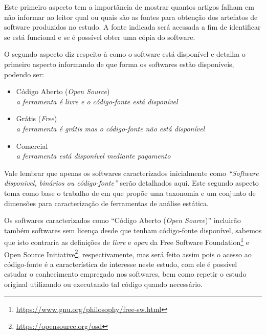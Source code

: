 Este primeiro aspecto tem a importância de mostrar quantos artigos falham em
não informar ao leitor qual ou quais são as fontes para obtenção dos artefatos
de software produzidos no estudo. A fonte indicada será acessada a fim de
identificar se está funcional e se é possível obter uma cópia do software.

%

O segundo aspecto diz respeito à como o software está disponível e detalha o
primeiro aspecto informando de que forma os softwares estão disponíveis, podendo
ser:

\begin{itemize}
  \item Código Aberto ({\it Open Source})\\
    {\it \small a ferramenta é livre e o código-fonte está disponível}
  \item Grátis ({\it Free})\\
    {\it \small a ferramenta é grátis mas o código-fonte não está disponível}
  \item Comercial\\
    {\it \small a ferramenta está disponível mediante pagamento}
\end{itemize}

Vale lembrar que apenas os softwares caracterizados inicialmente como
{\it``Software disponivel, binários ou código-fonte''} serão detalhados aqui.
Este segundo aspecto toma como base o trabalho de  em que
propõe uma taxonomia e um conjunto de dimensões para caracterização de
ferramentas de análise estática.

Os softwares caracterizados como ``Código Aberto ({\it Open Source})''
incluirão também softwares sem licença desde que tenham código-fonte
disponível, sabemos que isto contraria as definições de {\it livre} e
{\it open} da Free Software
Foundation\footnote{\url{https://www.gnu.org/philosophy/free-sw.html}} e Open
Source Initiative\footnote{\url{https://opensource.org/osd}}, respectivamente,
mas será feito assim pois o acesso ao código-fonte é a característica
de interesse neste estudo, com ele é possível estudar o
conhecimento empregado nos softwares, bem como repetir o estudo original
utilizando ou executando tal código quando necessário.

